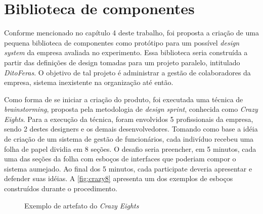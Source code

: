 
\chapter{Biblioteca de componentes}
\label{chap:bibComponentes}

Conforme mencionado no capítulo 4 deste trabalho, foi proposta a criação de uma pequena biblioteca de componentes como protótipo para um possível \textit{design system} da empresa avaliada no experimento. Essa biblioteca seria construída a partir das definições de design tomadas para um projeto paralelo, intitulado \textit{DitoFeras}. O objetivo de tal projeto é administrar a gestão de colaboradores da empresa, sistema inexistente na organização até então.

Como forma de se iniciar a criação do produto, foi executada uma técnica de \textit{brainstorming}, proposta pela metodologia de \textit{design sprint}, conhecida como \textit{Crazy Eights}. Para a execução da técnica, foram envolvidos 5 profissionais da empresa, sendo 2 destes designers e os demais desenvolvedores. Tomando como base a idéia de criação de um sistema de gestão de funcionários, cada indivíduo recebeu uma folha de papel dividia em 8 seções. O desafio seria preencher, em 5 minutos, cada uma das seções da folha com esboços de interfaces que poderiam compor o sistema aumejado. Ao final dos 5 minutos, cada participate deveria apresentar e defender suas idéias. A \autoref{fig:crazy8} apresenta um dos exemplos de esboços construídos durante o procedimento.

\begin{figure}
  \caption{Exemplo de artefato do \textit{Crazy Eights}}
  \label{fig:crazy8}
\end{figure}

